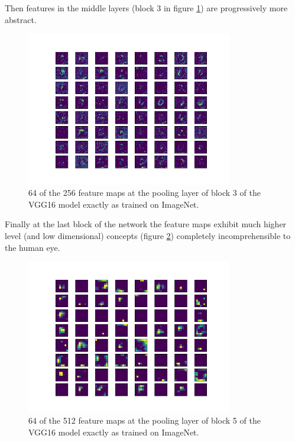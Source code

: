 Then features in the middle layers (block 3 in figure \ref{fig:vgg16_block3}) are progressively more abstract.

\begin{figure}
    \centering
    \includegraphics[width=0.8\textwidth]{figs/vgg16_block3.png}
    \caption{64 of the 256 feature maps at the pooling layer of block 3 of the VGG16 model exactly as trained on ImageNet.}
    \label{fig:vgg16_block3}
\end{figure}

Finally at the last block of the network the feature maps exhibit much higher level (and low dimensional) concepts (figure \ref{fig:vgg16_block5}) completely incomprehensible to the human eye.

\begin{figure}
    \centering
    \includegraphics[width=0.8\textwidth]{figs/vgg16_block5.png}
    \caption{64 of the 512 feature maps at the pooling layer of block 5 of the VGG16 model exactly as trained on ImageNet.}
    \label{fig:vgg16_block5}
\end{figure}

